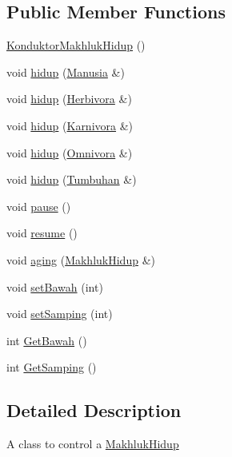 \subsection*{Public Member Functions}
\begin{DoxyCompactItemize}
\item 
\hyperlink{class_konduktor_makhluk_hidup_a2b85d7afd1474acec8d394a5e10cecd6}{Konduktor\+Makhluk\+Hidup} ()
\item 
void \hyperlink{class_konduktor_makhluk_hidup_a87e20c1fac7f69730e1f800928fdab59}{hidup} (\hyperlink{class_manusia}{Manusia} \&)
\item 
void \hyperlink{class_konduktor_makhluk_hidup_a6db50a642d5f184ca11aaeb6e275797f}{hidup} (\hyperlink{class_herbivora}{Herbivora} \&)
\item 
void \hyperlink{class_konduktor_makhluk_hidup_a46e2bf54054641c6c8b377ef4052da39}{hidup} (\hyperlink{class_karnivora}{Karnivora} \&)
\item 
void \hyperlink{class_konduktor_makhluk_hidup_a54ce9beb02fffa0320fd8f8a1315e255}{hidup} (\hyperlink{class_omnivora}{Omnivora} \&)
\item 
void \hyperlink{class_konduktor_makhluk_hidup_a247cde5e3f3e8bf9ffa015b90e29fe38}{hidup} (\hyperlink{class_tumbuhan}{Tumbuhan} \&)
\item 
void \hyperlink{class_konduktor_makhluk_hidup_a90086da731ab404c57c96db90d6bb968}{pause} ()
\item 
void \hyperlink{class_konduktor_makhluk_hidup_af1086cb49d657605bb998db36abec897}{resume} ()
\item 
void \hyperlink{class_konduktor_makhluk_hidup_aa241caf5c346f96f9717183dd60b9414}{aging} (\hyperlink{class_makhluk_hidup}{Makhluk\+Hidup} \&)
\item 
void \hyperlink{class_konduktor_makhluk_hidup_aa299db55a0e7ab426d2ba61bda3b84a5}{set\+Bawah} (int)
\item 
void \hyperlink{class_konduktor_makhluk_hidup_aa120358e949c0dc53286cbff0d5ea4e3}{set\+Samping} (int)
\item 
int \hyperlink{class_konduktor_makhluk_hidup_a4c9b65dc15d4b3b3a41b885b5030009c}{Get\+Bawah} ()
\item 
int \hyperlink{class_konduktor_makhluk_hidup_a453d35d38b281010dead4ea842be9360}{Get\+Samping} ()
\end{DoxyCompactItemize}


\subsection{Detailed Description}
A class to control a \hyperlink{class_makhluk_hidup}{Makhluk\+Hidup} 

